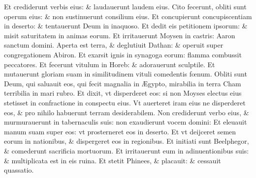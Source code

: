 \documentclass[a5paper,10pt]{book}
\def\AE{Æ}
\def\oe{œ}
\begin{document}
\begin{multicols*}{2}
\newline \color{red} E\color{black}t crediderunt verbis eius: \& laudauerunt laudem eius.
\newline \color{red} C\color{black}ito fecerunt, obliti sunt operum eius: \& non sustinuerunt consilium eius.
\newline \color{red} E\color{black}t concupierunt concupiscentiam in deserto: \& tentauerunt Deum in inaquoso.
\newline \color{red} E\color{black}t dedit eis petitionem ipsorum: \& misit saturitatem in animas eorum.
\newline \color{red} E\color{black}t irritauerunt Moysen in castris: Aaron sanctum domini.
\newline \color{red} A\color{black}perta est terra, \& deglutiuit Dathan: \& operuit super congregationem Abiron.
\newline \color{red} E\color{black}t exarsit ignis in synagoga eorum: flamma combussit peccatores.
\newline \color{red} E\color{black}t fecerunt vitulum in Horeb: \& adorauerunt sculptile.
\newline \color{red} E\color{black}t mutauerunt gloriam suam in similitudinem vituli comedentis f\oe num.
\newline \color{red} O\color{black}bliti sunt Deum, qui saluauit eos, qui fecit magnalia in \AE gypto, mirabilia in terra Cham terribilia in mari rubro.
\newline \color{red} E\color{black}t dixit, vt disperderet eos: si non Moyses electus eius stetisset in confractione in conspectu eius.
\newline \color{red} V\color{black}t auerteret iram eius ne disperderet eos, \& pro nihilo habuerunt terram desiderabilem.
\newline \color{red} N\color{black}on crediderunt verbo eius, \& murmurauerunt in tabernaculis suis: non exaudierunt vocem domini:
\newline \color{red} E\color{black}t eleuauit manum suam super eos: vt prosterneret eos in deserto.
\newline \color{red} E\color{black}t vt deijceret semen eorum in nationibus, \& dispergeret eos in regionibus.
\newline \color{red} E\color{black}t initiati sunt Beelphegor, \& comederunt sacrificia mortuorum.
\newline \color{red} E\color{black}t irritauerunt eum in adinuentionibus suis: \& multiplicata est in eis ruina.
\newline \color{red} E\color{black}t stetit Phinees, \& placauit: \& cessauit quassatio.

\end{multicols*}
\end{document}
